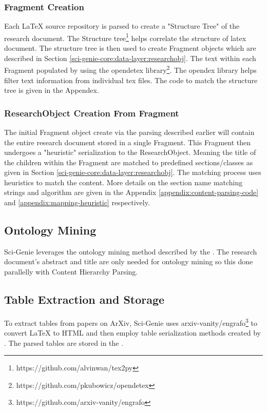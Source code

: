 \subsubsection{Fragment Creation}
Each LaTeX source repository is parsed to create a "Structure Tree" of the research document. The Structure tree\footnote{https://github.com/alvinwan/tex2py} helps correlate the structure of latex document. The structure tree is then used to create Fragment objects which are described in Section \ref{sci-genie-core:data-layer:researchobj}. The text within each Fragment populated by using the opendetex library\footnote{https://github.com/pkubowicz/opendetex}. The opendex library helps filter text information from individual tex files. The code to match the structure tree is given in the Appendex. 

\subsubsection{ResearchObject Creation From Fragment}
The initial Fragment object create via the parsing described earlier will contain the entire research document stored in a single Fragment. This Fragment then undergoes a "heuristic" serialization to the ResearchObject. Meaning the title of the children within the Fragment are matched to predefined sections/classes as given in Section \ref{sci-genie-core:data-layer:researchobj}. The matching process uses heuristics to match the content. More details on the section name matching strings and algorithm are given in the Appendix \ref{appendix:content-parsing-code} and \ref{appendix:mapping-heuristic} respectively. 

\subsection{Ontology Mining}
Sci-Genie leverages the ontology mining method described by the \cite{salatino2020ontology}. The research document's abstract and title are only needed for ontology mining so this done parallelly with Content Hierarchy Parsing. 

\subsection{Table Extraction and Storage}
To extract tables from papers on ArXiv, Sci-Genie uses arxiv-vanity/engrafo\footnote{https://github.com/arxiv-vanity/engrafo} to convert LaTeX to HTML and then employ table serialization methods created by \cite{kardas2020axcell}. The parsed tables are stored in the . 


